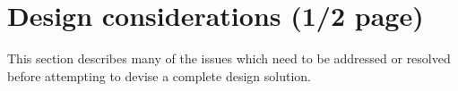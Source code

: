 \section{Design considerations (1/2 page)}

This section describes many of the issues which need to be addressed or
resolved before attempting to devise a complete design solution.
